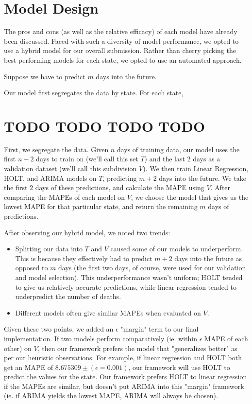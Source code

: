 \documentclass[sigconf,nonacm]{acmart}
\begin{document}
\section{Model Design}

The pros and cons (as well as the relative efficacy) of each model have already
been discussed. Faced with such a diversity of model performance, we opted to
use a hybrid model for our overall submission. Rather than cherry picking the
best-performing models for each state, we opted to use an automated approach. 

Suppose we have to predict $m$ days into the future. 

Our model first segregates the data by state. For each state,

\section{TODO TODO TODO TODO}

First, we segregate the data. Given $n$ days of training data, our model uses
the first $n-2$ days to train on (we'll call this set $T$) and the last $2$
days as a validation dataset (we'll call this subdivision $V$). 
We then train Linear Regression, HOLT, and ARIMA models on $T$, predicting
$m+2$ days into the future. We take the first $2$ days of these predictions,
and calculate the MAPE using $V$. After comparing the MAPEs of each model on
$V$, we choose the model that gives us the lowest MAPE for that particular
state, and return the remaining $m$ days of predictions. 

After observing our hybrid model, we noted two trends: 
\begin{itemize}
\item 
Splitting our data into $T$ and $V$ caused some of our models to
underperform. This is because they effectively had to predict $m+2$ days into
the future as opposed to $m$ days (the first two days, of course, were used for
our validation and model selection). This underperformance wasn't uniform;
HOLT tended to give us relatively accurate predictions, while linear regression
tended to underpredict the number of deaths. 
\item
Different models often give similar MAPEs when evaluated on $V$. 
\end{itemize}

Given these two points, we added an $\epsilon$ "margin" term to our final
implementation. If two models perform comparatively (ie. within $\epsilon$ MAPE
of each other) on $V$, then our framework prefers the model that "generalizes
better" as per our heuristic observations. For example, if linear regression
and HOLT both get an MAPE of $8.675309 \pm (\epsilon = 0.001)$, our framework
will use HOLT to predict the values for the state. Our framework prefers HOLT
to linear regression if the MAPEs are similar, but doesn't put ARIMA into this
"margin" framework (ie. if ARIMA yields the lowest MAPE, ARIMA will always be
chosen). 



\end{document}
